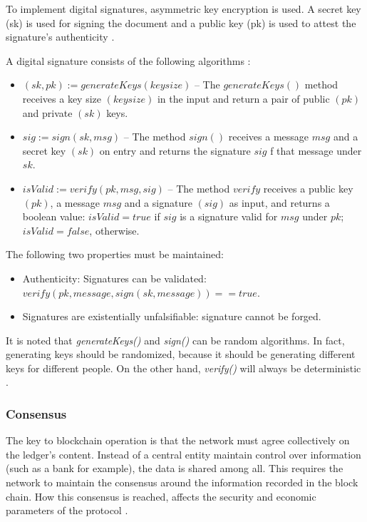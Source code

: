 To implement digital signatures, asymmetric key encryption is used. A secret key (sk) is used for signing the document and a public key (pk) is used to attest the signature's authenticity \cite{greve2018blockchain}.

A digital signature consists of the following algorithms \cite{narayanan2016bitcoin}:

\begin{itemize}
\item $(sk , pk) := generateKeys(keysize)$ – The $generateKeys()$ method receives a key size $(keysize)$ in the input and return a pair of public $(pk)$ and private $(sk)$ keys.
\item $sig := sign(sk , msg)$ – The method $sign()$ receives a message $msg$ and a secret key $(sk)$ on entry and returns the signature $sig$ f that message under $sk$.
\item $isValid := veri f y(pk , msg , sig)$ – The method $verify$ receives a public key $(pk)$, a message $msg$ and a signature $(sig)$ as input, and returns a boolean value: $isValid = true$ if $sig$ is a signature valid for $msg$ under $pk$; $isValid = false$, otherwise.
\end{itemize}

The following two properties must be maintained:

\begin{itemize}
\item Authenticity: Signatures can be validated: \\ $verify(pk, message, sign(sk, message)) = = true$.
\item Signatures are existentially unfalsifiable: signature cannot be forged.
\end{itemize}

It is noted that \textit{generateKeys()} and \textit{sign()} can be random algorithms. In fact, generating keys should be randomized, because it should be generating different keys for different people. On the other hand, \textit{verify()} will always be deterministic \cite{greve2018blockchain}.

\subsubsection{Consensus}\label{sec:consenso}
The key to blockchain operation is that the network must agree collectively on the ledger's content. Instead of a central entity maintain control over information (such as a bank for example), the data is shared among all. This requires the network to maintain the consensus around the information recorded in the block chain. How this consensus is reached, affects the security and economic parameters of the protocol \cite{kostarev2017review}.

